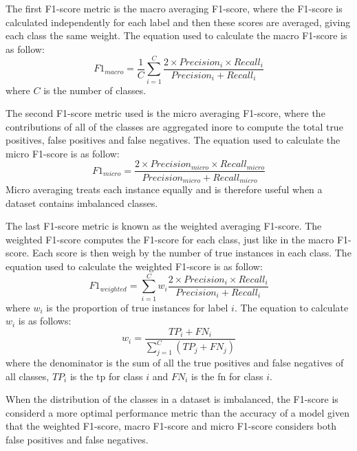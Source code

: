 \documentclass[10pt, conference]{IEEEtran}
\begin{document}
The first F1-score metric is the macro averaging F1-score, where the F1-score is calculated  independently for each label
and then these scores are averaged, giving each class the same weight. The equation used to calculate the macro F1-score is
as follow:
\begin{equation}
    F1_{macro} = \frac{1}{C} \sum_{i=1}^{C} \frac{2 \times Precision_i \times Recall_i}{Precision_i + Recall_i} \label{macro_F1}
\end{equation}
where $C$ is the number of classes.

The second F1-score metric used is the micro averaging F1-score, where the contributions of all of the classes
are aggregated inore to compute the total true positives, false positives and false negatives. The equation used
to calculate the micro F1-score is as follow:
\begin{equation}
    F1_{micro} = \frac{2 \times Precision_{micro} \times Recall_{micro}}{Precision_{micro} + Recall_{micro}} \label{micro_F1}
\end{equation}
Micro averaging treats each instance equally and is therefore useful when a dataset contains imbalanced classes. 

The last F1-score metric is known as the weighted averaging F1-score. The weighted F1-score computes the F1-score
for each class, just like in the macro F1-score. Each score is then weigh by the number of true instances in each class.
The equation used to calculate the weighted F1-score is as follow:
\begin{equation}
    F1_{weighted} = \sum_{i=1}^{C} w_i \frac{2 \times Precision_i \times Recall_i}{Precision_i + Recall_i} \label{weight_F1}
\end{equation}
where $w_i$ is the proportion of true instances for label $i$. The equation to calculate $w_i$ is as follows:
\begin{equation}
    w_i = \frac{TP_i + FN_i}{\sum_{j=1}^{C}(TP_j + FN_j)}    
\end{equation}
where the denominator is the sum of all the true positives and false negatives of all classes, $TP_i$ is the \acrshort{tp}
for class $i$ and $FN_i$ is the \acrshort{fn} for class $i$.

When the distribution of the classes in a dataset is imbalanced, the F1-score is considerd a more optimal performance metric
than the accuracy of a model given that the weighted F1-score, macro F1-score and micro F1-score considers both false positives
and false negatives.
\end{document}

